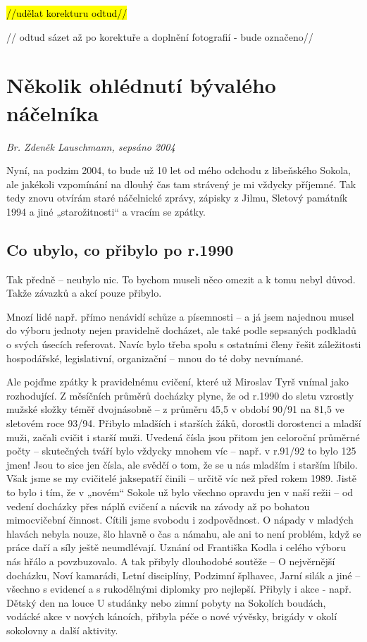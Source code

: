 \hl{//udělat korekturu odtud//}

// odtud sázet až po korektuře a doplnění fotografií - bude označeno//

\section{Několik ohlédnutí bývalého
náčelníka}\label{nux11bkolik-ohluxe9dnutuxed-buxfdvaluxe9ho-nuxe1ux10delnuxedka}

\emph{Br. Zdeněk Lauschmann, sepsáno 2004}

Nyní, na podzim 2004, to bude už 10 let od mého odchodu z libeňského
Sokola, ale jakékoli vzpomínání na dlouhý čas tam strávený je mi vždycky
příjemné. Tak tedy znovu otvírám staré náčelnické zprávy, zápisky z
Jilmu, Sletový památník 1994 a jiné „starožitnosti`` a vracím se zpátky.

\subsection{Co ubylo, co přibylo po
r.1990}\label{co-ubylo-co-pux159ibylo-po-r.1990}

Tak předně -- neubylo nic. To bychom museli něco omezit a k tomu nebyl
důvod. Takže závazků a akcí pouze přibylo.

Mnozí lidé např. přímo nenávidí schůze a písemnosti -- a já jsem
najednou musel do výboru jednoty nejen pravidelně docházet, ale také
podle sepsaných podkladů o svých úsecích referovat. Navíc bylo třeba
spolu s ostatními členy řešit záležitosti hospodářské, legislativní,
organizační -- mnou do té doby nevnímané.

Ale pojďme zpátky k pravidelnému cvičení, které už Miroslav Tyrš vnímal
jako rozhodující. Z měsíčních průměrů docházky plyne, že od r.1990 do
sletu vzrostly mužské složky téměř dvojnásobně -- z průměru 45,5 v
období 90/91 na 81,5 ve sletovém roce 93/94. Přibylo mladších i starších
žáků, dorostli dorostenci a mladší muži, začali cvičit i starší muži.
Uvedená čísla jsou přitom jen celoroční průměrné počty -- skutečných
tváří bylo vždycky mnohem víc -- např. v r.91/92 to bylo 125 jmen! Jsou
to sice jen čísla, ale svědčí o tom, že se u nás mladším i starším
líbilo. Však jsme se my cvičitelé jaksepatří činili -- určitě víc než
před rokem 1989. Jistě to bylo i tím, že v „novém`` Sokole už bylo
všechno opravdu jen v naší režii -- od vedení docházky přes náplň
cvičení a nácvik na závody až po bohatou mimocvičební činnost. Cítili
jsme svobodu i zodpovědnost. O nápady v mladých hlavách nebyla nouze,
šlo hlavně o čas a námahu, ale ani to není problém, když se práce daří a
síly ještě neumdlévají. Uznání od Františka Kodla i celého výboru nás
hřálo a povzbuzovalo. A tak přibyly dlouhodobé soutěže -- O nejvěrnější
docházku, Noví kamarádi, Letní disciplíny, Podzimní šplhavec, Jarní
silák a jiné -- všechno s evidencí a s rukodělnými diplomky pro
nejlepší. Přibyly i akce - např. Dětský den na louce U studánky nebo
zimní pobyty na Sokolích boudách, vodácké akce v nových kánoích, přibyla
péče o nové vývěsky, brigády v okolí sokolovny a další aktivity.

